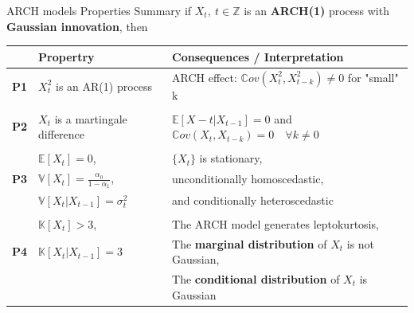 \documentclass{beamer}
\def\Z{\mathbb{Z}}
\def\Esp{\mathbb{E}}
\def\Var{\mathbb{V}}
\def\Cov{\mathbb{C}ov}
\def\Kurt{\mathbb{K}}
\begin{document}
\begin{frame}{ARCH models Properties Summary}
 if {$X_t, ~t\in \Z$} is an \textbf{ARCH(1)} process with \textbf{Gaussian innovation}, then
 \small
    \begin{table}
        \centering
        \begin{tabularx}{\linewidth}{m{0.3cm}>{\raggedright\arraybackslash}m{3.7cm} >{\raggedright\arraybackslash}m{7.3cm}}
        \toprule
           & \textbf{Propertry} & \textbf{Consequences / Interpretation}  \\
        \midrule
        \textbf{P1} & $X_t^2$ is an AR(1) process                        & ARCH effect: $\Cov(X_t^2, X_{t-k}^2) \neq 0$ for "small" k\\
        \\
        \textbf{P2} & $X_t$ is a martingale difference                   & $\Esp[X-t|X_{t-1}]=0$ and $\Cov(X_t, X_{t-k}) =0 \quad \forall k\neq 0$ \\
        \\
           & $\Esp[X_t] =0$, & $\{X_t\}$ is stationary,\\ 
        \textbf{P3} &$\Var[X_t] =\frac{\alpha_0}{1-\alpha_1}$, & unconditionally homoscedastic,\\ 
           & $\Var[X_t|X_{t-1}] = \sigma_t^2$  & and conditionally heteroscedastic\\
        \\
                    & $\Kurt[X_t]>3$,&  The ARCH model generates leptokurtosis,\\
        \textbf{P4} &$\Kurt[X_t|X_{t-1}]=3$ & The \textbf{marginal distribution} of $X_t$ is not Gaussian,\\
                    && The \textbf{conditional distribution} of $X_t$ is Gaussian\\
        \bottomrule
        \end{tabularx}
        \label{tab:my_label}
    \end{table}
    
\end{frame}
\end{document}
